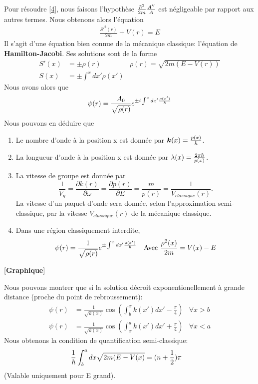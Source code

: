 \documentclass[../notesdecours]{subfiles}
\begin{document}
Pour résoudre \eqref{4}, nous faisons l'hypothèse $\frac{\hbar^2}{2m}\frac{A''}{A}$ est négligeable par rapport aux autres termes. Nous obtenons alors l'équation 
\begin{align*}
\frac{S'^2 (r)}{2m} + V(r) = E
\end{align*}
Il s'agit d'une équation bien connue de la mécanique classique: l'équation de \textbf{Hamilton-Jacobi}. Ses solutions sont de la forme
\begin{subequations}
\begin{align}
S'(x) &= \pm \rho (r)		&\rho (r) = \sqrt{2m(E-V(r))}\\
S(x) &= \pm \int^x dx' \rho (x')
\end{align}
\end{subequations}
Nous avons alors que
\begin{equation}
\psi (r) = \frac{A_0}{\sqrt{\rho (r)}}e^{\pm i \int^x dx' \frac{\rho (x')}{\hbar}}
\end{equation}
Nous pouvons en déduire que
\begin{enumerate}
\item Le nombre d'onde à la position x est donnée par $\bm{k}(x) = \frac{p(x)}{\hbar}$.
\item La longueur d'onde à la position x est donnée par $\lambda (x) = \frac{2\pi\hbar}{p(x)}$.
\item La vitesse de groupe est donnée par
\begin{equation}
\frac{1}{V_g} = \frac{\partial k(r)}{\partial \omega} = \frac{\partial p(r)}{\partial E} = \frac{m}{p(r)} = \frac{1}{V_{classique} (r)}.
\end{equation}
La vitesse d'un paquet d'onde sera donnée, selon l'approximation semi-classique, par la vitesse $V_{classique} (r)$ de la mécanique classique.
\item Dans une région classiquement interdite,
\begin{align}
&\psi (r) = \frac{1}{\sqrt{\rho (r)}} e^{\pm \int^x dx' \frac{\rho(x')}{\hbar}}	&\text{Avec } \frac{\rho^2 (x)}{2m} = V(x)-E
\end{align}
\end{enumerate}

[\textbf{Graphique}]

Nous pouvons montrer que si la solution décroit exponentionellement à grande distance (proche du point de rebroussement):
\begin{align}
\psi(r) &= \frac{1}{\sqrt{k(x)}} \cos (\int_b^x k(x') dx' - \frac{\pi}{4})	&\forall x > b\\
\psi(r) &= \frac{1}{\sqrt{k(x)}} \cos (\int_x^a k(x')dx'+\frac{\pi}{4})		&\forall x < a
\end{align}
Nous obtenons la condition de quantification semi-classique:
\begin{align}
\frac{1}{\hbar} \int^a_b dx\sqrt{2m(E-V(x)} &= (n+\frac{1}{2})\pi
\end{align}
(Valable uniquement pour E grand).
\end{document}
